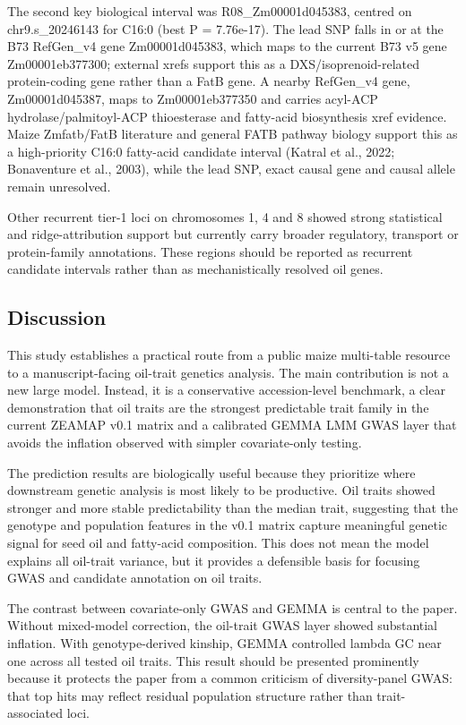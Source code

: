 \documentclass[
]{article}
\begin{document}
The second key biological interval was R08\_Zm00001d045383, centred on
chr9.s\_20246143 for C16:0 (best P = 7.76e-17). The lead SNP falls in or
at the B73 RefGen\_v4 gene Zm00001d045383, which maps to the current B73
v5 gene Zm00001eb377300; external xrefs support this as a
DXS/isoprenoid-related protein-coding gene rather than a FatB gene. A
nearby RefGen\_v4 gene, Zm00001d045387, maps to Zm00001eb377350 and
carries acyl-ACP hydrolase/palmitoyl-ACP thioesterase and fatty-acid
biosynthesis xref evidence. Maize Zmfatb/FatB literature and general
FATB pathway biology support this as a high-priority C16:0 fatty-acid
candidate interval (Katral et al., 2022; Bonaventure et al., 2003),
while the lead SNP, exact causal gene and causal allele remain
unresolved.

Other recurrent tier-1 loci on chromosomes 1, 4 and 8 showed strong
statistical and ridge-attribution support but currently carry broader
regulatory, transport or protein-family annotations. These regions
should be reported as recurrent candidate intervals rather than as
mechanistically resolved oil genes.

\subsection{Discussion}\label{discussion}

This study establishes a practical route from a public maize multi-table
resource to a manuscript-facing oil-trait genetics analysis. The main
contribution is not a new large model. Instead, it is a conservative
accession-level benchmark, a clear demonstration that oil traits are the
strongest predictable trait family in the current ZEAMAP v0.1 matrix and
a calibrated GEMMA LMM GWAS layer that avoids the inflation observed
with simpler covariate-only testing.

The prediction results are biologically useful because they prioritize
where downstream genetic analysis is most likely to be productive. Oil
traits showed stronger and more stable predictability than the median
trait, suggesting that the genotype and population features in the v0.1
matrix capture meaningful genetic signal for seed oil and fatty-acid
composition. This does not mean the model explains all oil-trait
variance, but it provides a defensible basis for focusing GWAS and
candidate annotation on oil traits.

The contrast between covariate-only GWAS and GEMMA is central to the
paper. Without mixed-model correction, the oil-trait GWAS layer showed
substantial inflation. With genotype-derived kinship, GEMMA controlled
lambda GC near one across all tested oil traits. This result should be
presented prominently because it protects the paper from a common
criticism of diversity-panel GWAS: that top hits may reflect residual
population structure rather than trait-associated loci.
\end{document}
